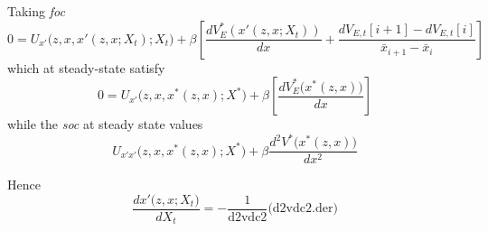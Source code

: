 \documentclass[a4paper,10pt]{article}  %
\begin{document}
Taking \emph{foc}
\begin{equation}
   \label{eq:foc}
   0 = U_{x'} \Big( z, x, x'(z,x;X_t ); X_t \Big) + \beta 
   \left[
      \frac{ dV_E^*(x'( z,x;X_t) ) }{ dx } + \frac{ dV_{E,t}[ i+1 ] - dV_{E,t}[i] }{ \bar{x}_{i+1} - \bar{x}_{i} }
   \right]  
   \tag{dvdc}
\end{equation}
which at steady-state satisfy
\begin{equation*}
   \label{eq:focstst}
   0 = U_{x'} \Big( z, x, x^*(z,x); X^* \Big) + \beta 
   \left[
      \frac{ dV_E^* \Big(x^*(z,x) \Big) }{ dx }
   \right]  
\end{equation*}
while the \emph{soc} at steady state values
\begin{equation}
   \label{eq:soc}
   U_{x'x'} \Big( z,x, x^*(z,x); X^* \Big) + \beta \frac{d^2V^*\Big( x^*(z,x) \Big)}{dx^2}
   \tag{d2vdc2}
\end{equation}

Hence
\begin{equation}
   \label{eq:}
   \frac{ dx'\Big( z,x; X_t\Big) }{ dX_t } = - \frac{1}{ \text{d2vdc2} } \Big( \text{d2vdc2.der} \Big)
\end{equation}



\clearpage
\newpage
% 
% 

% 
\end{document}

